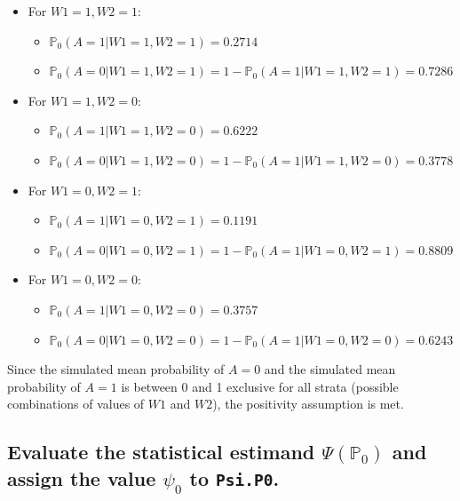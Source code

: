 \documentclass{article}\usepackage[]{graphicx}\usepackage[]{xcolor}
\begin{document}
\begin{itemize}
  \item For $W1=1,W2=1$:
  \begin{itemize}
    \item $\mathbb{P}_0(A=1|W1=1,W2=1)=0.2714$
    \item $\mathbb{P}_0(A=0|W1=1,W2=1)=1-\mathbb{P}_0(A=1|W1=1,W2=1)=0.7286$
  \end{itemize}
  \item For $W1=1,W2=0$:
  \begin{itemize}
    \item $\mathbb{P}_0(A=1|W1=1,W2=0)=0.6222$
    \item $\mathbb{P}_0(A=0|W1=1,W2=0)=1-\mathbb{P}_0(A=1|W1=1,W2=0)=0.3778$  
  \end{itemize}
  \item For $W1=0,W2=1$:
  \begin{itemize}
    \item $\mathbb{P}_0(A=1|W1=0,W2=1)=0.1191$
    \item $\mathbb{P}_0(A=0|W1=0,W2=1)=1-\mathbb{P}_0(A=1|W1=0,W2=1)=0.8809$  
  \end{itemize}
  \item For $W1=0,W2=0$:
  \begin{itemize}
    \item $\mathbb{P}_0(A=1|W1=0,W2=0)=0.3757$
    \item $\mathbb{P}_0(A=0|W1=0,W2=0)=1-\mathbb{P}_0(A=1|W1=0,W2=0)=0.6243$
  \end{itemize}
\end{itemize}

Since the simulated mean probability of $A=0$ and the simulated mean probability of $A=1$ is between 0 and 1 exclusive for all strata (possible combinations of values of $W1$ and $W2$), the positivity assumption is met.

  \subsection{Evaluate the statistical estimand $\Psi(\mathbb{P}_0)$ and assign the value $\psi_0$ to \texttt{Psi.P0}.}
\end{document}
